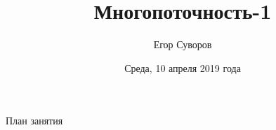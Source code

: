 \documentclass[utf8,xcolor=table]{beamer}
\title[Многопоточность-1]{Многопоточность-1}
\author{Егор Суворов}
\institute[СПбГУ]{Курс <<Парадигмы и языки программирования>>, группа 18.Б09-пу}
\date[10.04.2019]{Среда, 10 апреля 2019 года}
\begin{document}
\begin{frame}
\titlepage
\end{frame}

\begin{frame}{План занятия}
	\tableofcontents
\end{frame}










\end{document}
